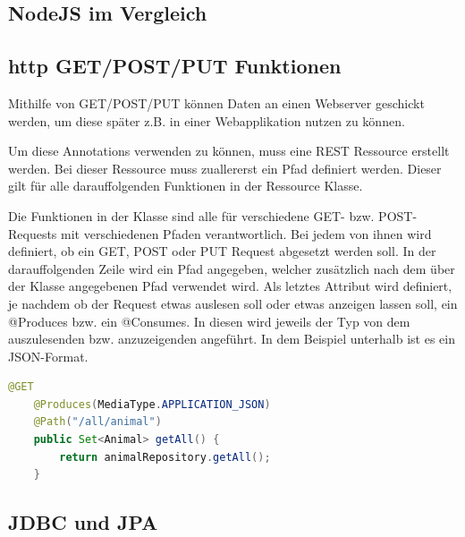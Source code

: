 \subsection{NodeJS im Vergleich}
\subsection{http GET/POST/PUT Funktionen}
Mithilfe von GET/POST/PUT können Daten an einen Webserver geschickt werden, um diese später z.B. in einer Webapplikation nutzen zu können.
 
Um diese Annotations verwenden zu können, muss eine REST Ressource erstellt werden.
Bei dieser Ressource muss zuallererst ein Pfad definiert werden. Dieser gilt für alle darauffolgenden Funktionen in der Ressource Klasse.
 
Die Funktionen in der Klasse sind alle für verschiedene GET- bzw. POST-Requests mit verschiedenen Pfaden verantwortlich. Bei jedem von ihnen wird definiert, ob ein GET, POST oder PUT Request abgesetzt werden soll. In der darauffolgenden Zeile wird ein Pfad angegeben, welcher zusätzlich nach dem über der Klasse angegebenen Pfad verwendet wird. Als letztes Attribut wird definiert, je nachdem ob der Request etwas auslesen soll oder etwas anzeigen lassen soll, ein @Produces bzw. ein @Consumes. In diesen wird jeweils der Typ von dem auszulesenden bzw. anzuzeigenden angeführt. In dem Beispiel unterhalb ist es ein JSON-Format.
 
\begin{lstlisting}[language=java,caption=Quarkus POST-Request,label=lst:impl:canvasJSchartOptions]
    @GET
    @Produces(MediaType.APPLICATION_JSON)
    @Path("/all/animal")
    public Set<Animal> getAll() {
        return animalRepository.getAll();
    }
  \end{lstlisting}
 
\subsection{JDBC und JPA}



